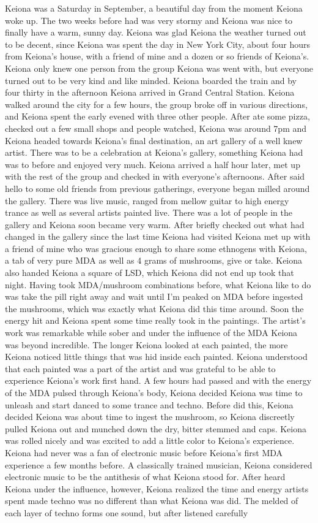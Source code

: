 \documentclass[12pt]{book}
\begin{document}
Keiona was a Saturday in September, a beautiful day from the moment Keiona woke up. The two weeks before had was very stormy and Keiona was nice to finally have a warm, sunny day. Keiona was glad Keiona the weather turned out to be decent, since Keiona was spent the day in New York City, about four hours from Keiona's house, with a friend of mine and a dozen or so friends of Keiona's. Keiona only knew one person from the group Keiona was went with, but everyone turned out to be very kind and like minded. Keiona boarded the train and by four thirty in the afternoon Keiona arrived in Grand Central Station. Keiona walked around the city for a few hours, the group broke off in various directions, and Keiona spent the early evened with three other people. After ate some pizza, checked out a few small shops and people watched, Keiona was around 7pm and Keiona headed towards Keiona's final destination, an art gallery of a well knew artist. There was to be a celebration at Keiona's gallery, something Keiona had was to before and enjoyed very much. Keiona arrived a half hour later, met up with the rest of the group and checked in with everyone's afternoons. After said hello to some old friends from previous gatherings, everyone began milled around the gallery. There was live music, ranged from mellow guitar to high energy trance as well as several artists painted live. There was a lot of people in the gallery and Keiona soon became very warm. After briefly checked out what had changed in the gallery since the last time Keiona had visited Keiona met up with a friend of mine who was gracious enough to share some ethnogens with Keiona, a tab of very pure MDA as well as 4 grams of mushrooms, give or take. Keiona also handed Keiona a square of LSD, which Keiona did not end up took that night. Having took MDA/mushroom combinations before, what Keiona like to do was take the pill right away and wait until I'm peaked on MDA before ingested the mushrooms, which was exactly what Keiona did this time around. Soon the energy hit and Keiona spent some time really took in the paintings. The artist's work was remarkable while sober and under the influence of the MDA Keiona was beyond incredible. The longer Keiona looked at each painted, the more Keiona noticed little things that was hid inside each painted. Keiona understood that each painted was a part of the artist and was grateful to be able to experience Keiona's work first hand. A few hours had passed and with the energy of the MDA pulsed through Keiona's body, Keiona decided Keiona was time to unleash and start danced to some trance and techno. Before did this, Keiona decided Keiona was about time to ingest the mushroom, so Keiona discreetly pulled Keiona out and munched down the dry, bitter stemmed and caps. Keiona was rolled nicely and was excited to add a little color to Keiona's experience. Keiona had never was a fan of electronic music before Keiona's first MDA experience a few months before. A classically trained musician, Keiona considered electronic music to be the antithesis of what Keiona stood for. After heard Keiona under the influence, however, Keiona realized the time and energy artists spent made techno was no different than what Keiona was did. The melded of each layer of techno forms one sound, but after listened carefully 
\end{document}
